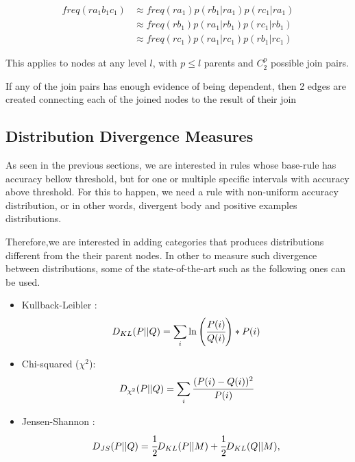 \begin{equation}
\begin{split} 
  freq(r a_1 b_1 c_1) &\approx freq(r a_1)p (r b_1|r a_1) p(r c_1|r a_1) \\ 
  &\approx  freq(r b_1) p(r a_1|r b_1) p(r c_1|r b_1) \\ 
  &\approx  freq(r c_1) p(r a_1|r c_1) p(r b_1|r c_1)  
\end{split}
\end{equation}

This applies to nodes at any level $l$, with $p \leq l$ parents and $C_{2}^{p}$ possible join pairs.

If any of the join pairs has enough evidence of being dependent, then 2 edges are created connecting each of the joined
nodes to the result of their join

\subsection{Distribution Divergence Measures}

As seen in the previous sections, we are interested in rules whose base-rule has accuracy bellow threshold,
but for one or multiple specific intervals with accuracy above threshold. For this to happen, we need a rule with
non-uniform accuracy distribution, or in other words, divergent body and positive examples distributions.

Therefore,we are interested in adding categories that produces distributions different from the their
parent nodes. In other to measure such divergence between distributions, some of the state-of-the-art such as the
following ones can be used.

\begin{itemize}
 \item Kullback-Leibler \cite{Kullback51klDivergence}: 
    \begin{equation}
      D_{KL}(P||Q)=\sum_{\substack{i}}\ln\left(\cfrac{P(i)}{Q(i)}\right)*P(i)
    \end{equation}
 \item Chi-squared ($\chi^2$):
    \begin{equation}
      D_{\chi^2}(P||Q)=\sum_{\substack{i}}\cfrac{(P(i)-Q(i))^2}{P(i)}
    \end{equation}
 \item Jensen-Shannon \cite{17795}:
    \begin{equation}
      D_{JS}(P||Q)=\cfrac{1}{2}D_{KL}(P||M)+\cfrac{1}{2}D_{KL}(Q||M), 
    \end{equation}
\end{itemize}

